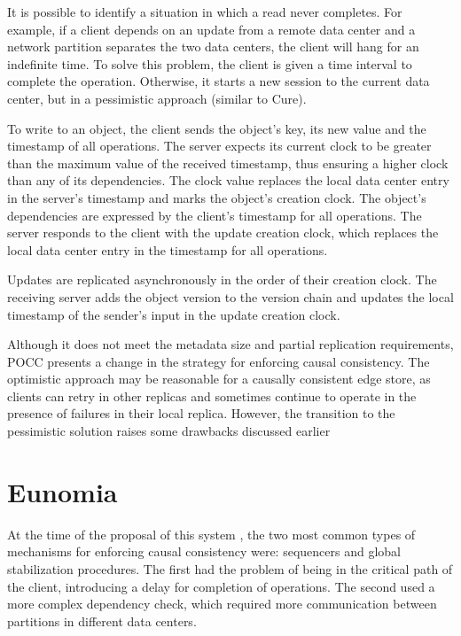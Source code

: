 It is possible to identify a situation in which a read never completes. For example, if a client depends on an update from a remote data center and a network partition separates the two data centers, the client will hang for an indefinite time. To solve this problem, the client is given a time interval to complete the operation. Otherwise, it starts a new session to the current data center, but in a pessimistic approach (similar to Cure). 

To write to an object, the client sends the object's key, its new value and the timestamp of all operations. The server expects its current clock to be greater than the maximum value of the received timestamp, thus ensuring a higher clock than any of its dependencies. The clock value replaces the local data center entry in the server's timestamp and marks the object's creation clock. The object's dependencies are expressed by the client's timestamp for all operations. The server responds to the client with the update creation clock, which replaces the local data center entry in the timestamp for all operations. 

Updates are replicated asynchronously in the order of their creation clock. The receiving server adds the object version to the version chain and updates the local timestamp of the sender's input in the update creation clock. 

Although it does not meet the metadata size and partial replication requirements, POCC presents a change in the strategy for enforcing causal consistency. The optimistic approach may be reasonable for a causally consistent edge store, as clients can retry in other replicas and sometimes continue to operate in the presence of failures in their local replica. However, the transition to the pessimistic solution raises some drawbacks discussed earlier

\section{Eunomia}
\label{sec:soa:eunomia}

At the time of the proposal of this system \cite{gunawardhana2017unobtrusive}, the two most common types of mechanisms for enforcing causal consistency were: sequencers and global stabilization procedures. The first had the problem of being in the critical path of the client, introducing a delay for completion of operations. The second used a more complex dependency check, which required more communication between partitions in different data centers. 

